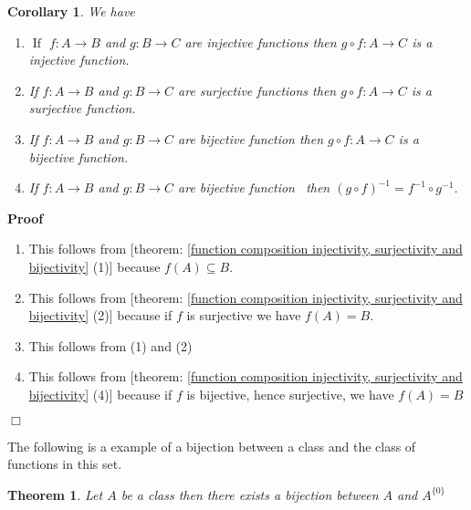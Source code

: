 \documentclass{book}
\newcommand{\tmop}[1]{\ensuremath{\operatorname{#1}}}
\newenvironment{proof}{\noindent\textbf{Proof\ }}{\hspace*{\fill}$\Box$\medskip}
\newtheorem{corollary}{Corollary}
\newtheorem{theorem}{Theorem}
\begin{document}
\begin{corollary}
  \label{function composition injectivity, surjectivity and bijectivity (1)}We
  have
  \begin{enumerate}
    \item $\tmop{If}$ $f : A \rightarrow B$ and $g : B \rightarrow C$ are
    injective functions then $g \circ f : A \rightarrow C$ is a injective
    function.
    
    \item If $f : A \rightarrow B$ and $g : B \rightarrow C$ are surjective
    functions then $g \circ f : A \rightarrow C$ is a surjective function.
    
    \item If $f : A \rightarrow B$ and $g : B \rightarrow C$ are bijective
    function then $g \circ f : A \rightarrow C$ is a bijective function.
    
    \item If $f : A \rightarrow B$ and $g : B \rightarrow C$ are bijective
    function \ then $(g \circ f)^{- 1} = f^{- 1} \circ g^{- 1}$.
  \end{enumerate}
\end{corollary}

\begin{proof}
  
  \begin{enumerate}
    \item This follows from [theorem: \ref{function composition injectivity,
    surjectivity and bijectivity} (1)] because $f (A) \subseteq B$.
    
    \item This follows from [theorem: \ref{function composition injectivity,
    surjectivity and bijectivity} (2)] because if $f$ is surjective we have $f
    (A) = B$.
    
    \item This follows from (1) and (2)
    
    \item This follows from [theorem: \ref{function composition injectivity,
    surjectivity and bijectivity} (4)] because if $f$ is bijective, hence
    surjective, we have $f (A) = B$
  \end{enumerate}
\end{proof}

The following is a example of a bijection between a class and the class of
functions in this set.

\begin{theorem}
  \label{function and power}Let $A$ be a class then there exists a bijection
  between $A$ and $A^{\{ 0 \}}$
\end{theorem}
\end{document}
